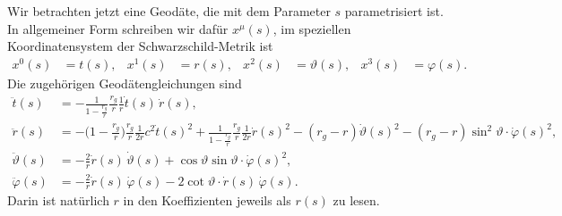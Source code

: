 Wir betrachten jetzt eine Geodäte, die mit dem Parameter $s$ parametrisiert ist.
In allgemeiner Form schreiben wir dafür $x^\mu(s)$, im speziellen
Koordinatensystem der Schwarzschild-Metrik ist
\[
\begin{aligned}
x^0(s)&=t(s),
&
x^1(s)&=r(s),
&
x^2(s)&=\vartheta(s),
&
x^3(s)&=\varphi(s).
\end{aligned}
\]
Die zugehörigen Geodätengleichungen sind
\begin{align*}
\ddot t(s)
&=
-\frac{1}{1-\displaystyle\frac{r_g}{r}}\frac{r_g}{r}\frac{1}{r}\dot t(s)\,\dot r(s),
\\
\ddot r(s)
&=
-\biggl(1-\frac{r_g}{r}\biggr)\frac{r_g}{r}\frac1{2r}c^2\dot t(s)^2
+\frac{1}{1-\displaystyle\frac{r_g}{r}} \frac{r_g}{r}\frac1{2r}\dot r(s)^2
-(r_g-r)\dot \vartheta(s)^2
-(r_g-r)\sin^2 \vartheta \cdot \dot \varphi(s)^2,
\\
\ddot \vartheta(s)
&=
-\frac{2}{r} \dot r(s)\, \dot \vartheta(s)
+\cos\vartheta\sin\vartheta \cdot \dot\varphi(s)^2,
\\
\ddot \varphi(s)
&=
-\frac{2}{r} \dot r(s)\,\dot \varphi(s)
-2\cot\vartheta \cdot \dot r(s)\,\dot\varphi(s).
\end{align*}
Darin ist natürlich $r$ in den Koeffizienten jeweils als $r(s)$ zu lesen.

